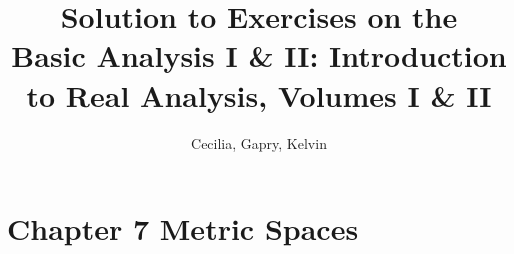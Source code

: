 \documentclass{article}
\title{Solution to Exercises on the \\Basic Analysis I \& II: Introduction to Real Analysis, Volumes I \& II}
\author{Cecilia, Gapry, Kelvin}
\begin{document}
\maketitle

\section*{Chapter 7 Metric Spaces}


\end{document}
